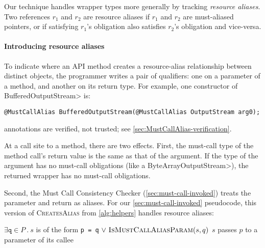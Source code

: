 Our technique handles wrapper types more generally by tracking \emph{resource
aliases}.  Two references $r_1$ and $r_2$ are resource aliases
if $r_1$ and $r_2$ are must-aliased pointers, or if
satisfying $r_1$'s \MustCall obligation also satisfies $r_2$'s
  obligation and vice-versa.

\paragraph{Introducing resource aliases}
To indicate where an API method creates a resource-alias
relationship between distinct objects, the programmer writes a pair of 
\MustCallAlias qualifiers:  one on a parameter
of a method, and another on its return type.
For example, one constructor of \<BufferedOutputStream> is:
\begin{lstlisting}[aboveskip=0.5em,belowskip=0.5em]
@MustCallAlias BufferedOutputStream(@MustCallAlias OutputStream arg0);
\end{lstlisting}
\noindent
\MustCallAlias annotations are verified, not trusted; see \cref{sec:MustCallAlias-verification}.

At a call site to a \MustCallAlias method, there are two effects.
First, the must-call type of the method call's return value
is the same as that of the \MustCallAlias
argument.  If the type of the argument has no must-call obligations (like a
\<ByteArrayOutputStream>), the returned wrapper has no must-call
obligations.

Second,
the Must Call Consistency Checker
(\cref{sec:must-call-invoked}) treats the \MustCallAlias parameter and return as
aliases.  For our \cref{sec:must-call-invoked} pseudocode, this
version of \textsc{CreatesAlias} from \cref{alg:helpers} handles resource aliases:
\begin{algorithmic}
    \State \Return $\exists \mathtt{q} \in P\ .\ s$ is of the form \texttt{p = q}\newline
         \hspace*{8em} $\vee\ \textsc{IsMustCallAliasParam}(s,q)$ 
  \EndProcedure
    \State \Return $s$ passes $p$ to a \MustCallAlias parameter of its callee
  \EndProcedure
\end{algorithmic}


